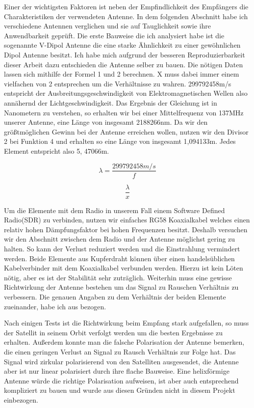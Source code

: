 \begin{multicols*}{2}
    Einer der wichtigsten Faktoren ist neben der Empfindlichkeit des Empfängers die Charakteristiken der verwendeten Antenne. In dem folgenden Abschnitt habe ich verschiedene Antennen verglichen und sie auf Tauglichkeit sowie ihre Anwendbarkeit geprüft. Die erste Bauweise die ich analysiert habe ist die sogenannte V-Dipol Antenne die eine starke Ähnlichkeit zu einer gewöhnlichen Dipol Antenne besitzt. Ich habe mich aufgrund der besseren Reproduzierbarkeit dieser Arbeit dazu entschieden die Antenne selber zu bauen. Die nötigen Daten lassen sich mithilfe der Formel 1 und 2 berechnen. X muss dabei immer einem vielfachen von 2 entsprechen um die Verhältnisse zu wahren. 299792458m/s entspricht der Ausbreitungsgeschwindigkeit von Elektromagnetischen Wellen also annähernd der Lichtgeschwindigkeit. Das Ergebnis der Gleichung ist in Nanometern zu verstehen, so erhalten wir bei einer Mittelfrequenz von 137MHz unserer Antenne, eine Länge von insgesamt 2188266nm. Da wir den größtmöglichen Gewinn bei der Antenne erreichen wollen, nutzen wir den Divisor 2 bei Funktion 4 und erhalten so eine Länge von insgesamt 1,094133m. Jedes Element entspricht also 5,
    47066m.    

    \begin{equation}
        \lambda = \frac{299792458 m/s}{f}  
    \end{equation}


    \begin{equation}
        \frac{\lambda}{x}  
    \end{equation}

    Um die Elemente mit dem Radio in unserem Fall einem Software Defined Radio(SDR) zu verbinden, nutzen wir einfaches RG58 Koaxialkabel welches einen relativ hohen Dämpfungsfaktor bei hohen Frequenzen besitzt. Deshalb versuchen wir den Abschnitt zwischen dem Radio und der Antenne möglichst gering zu halten. So kann der Verlust reduziert werden und die Einstrahlung vermindert werden. Beide Elemente aus Kupferdraht können über einen handelsüblichen Kabelverbinder mit dem Koaxialkabel verbunden werden. Hierzu ist kein Löten nötig, aber es ist der Stabilität sehr zuträglich. Weiterhin muss eine gewisse Richtwirkung der Antenne bestehen um das Signal zu Rauschen Verhältnis zu verbessern. Die genauen Angaben zu dem Verhältnis der beiden Elemente zueinander, habe ich aus \cite[]{Diy137MHz} bezogen. 

    Nach einigen Tests ist die Richtwirkung beim Empfang stark aufgefallen, so muss der Satellit in seinem Orbit verfolgt werden um die besten Ergebnisse zu erhalten. Außerdem konnte man die falsche Polarisation der Antenne bemerken, die einen geringen Verlust an Signal zu Rausch Verhältnis zur Folge hat. Das Signal wird zirkular polarisierend von den Satelliten ausgesendet, die Antenne aber ist nur linear polarisiert durch ihre flache Bauweise. Eine helixförmige Antenne würde die richtige Polarisation aufweisen, ist aber auch entsprechend kompliziert zu bauen und wurde aus diesen Gründen nicht in diesem Projekt einbezogen. 


\end{multicols*}
